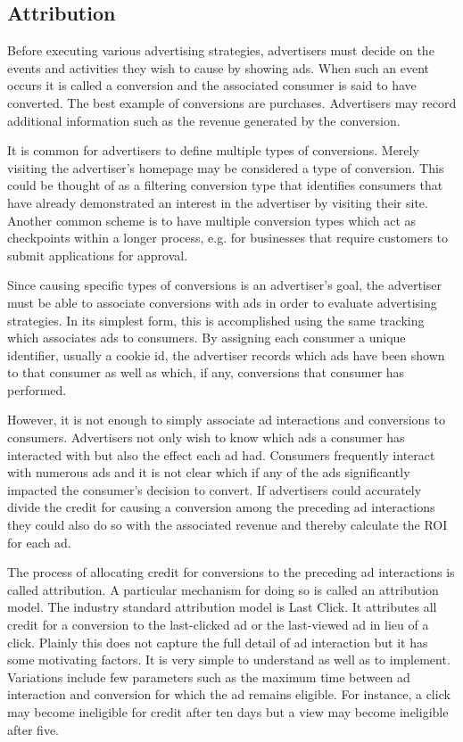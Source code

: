 \documentclass{article}
\begin{document}
\subsection{Attribution}

Before executing various advertising strategies, advertisers must decide on the events and activities they wish to cause by showing ads. When such an event occurs it is called a conversion and the associated consumer is said to have converted. The best example of conversions are purchases. Advertisers may record additional information such as the revenue generated by the conversion.

It is common for advertisers to define multiple types of conversions. Merely visiting the advertiser's homepage may be considered a type of conversion. This could be thought of as a filtering conversion type that identifies consumers that have already demonstrated an interest in the advertiser by visiting their site. Another common scheme is to have multiple conversion types which act as checkpoints within a longer process, e.g. for businesses that require customers to submit applications for approval.

Since causing specific types of conversions is an advertiser's goal, the advertiser must be able to associate conversions with ads in order to evaluate advertising strategies. In its simplest form, this is accomplished using the same tracking which associates ads to consumers. By assigning each consumer a unique identifier, usually a cookie id, the advertiser records which ads have been shown to that consumer as well as which, if any, conversions that consumer has performed.

However, it is not enough to simply associate ad interactions and conversions to consumers. Advertisers not only wish to know which ads a consumer has interacted with but also the effect each ad had. Consumers frequently interact with numerous ads and it is not clear which if any of the ads significantly impacted the consumer's decision to convert. If advertisers could accurately divide the credit for causing a conversion among the preceding ad interactions they could also do so with the associated revenue and thereby calculate the ROI for each ad.

The process of allocating credit for conversions to the preceding ad interactions is called attribution. A particular mechanism for doing so is called an attribution model. The industry standard attribution model is Last Click. It attributes all credit for a conversion to the last-clicked ad or the last-viewed ad in lieu of a click. Plainly this does not capture the full detail of ad interaction but it has some motivating factors. It is very simple to understand as well as to implement. Variations include few parameters such as the maximum time between ad interaction and conversion for which the ad remains eligible. For instance, a click may become ineligible for credit after ten days but a view may become ineligible after five.
\end{document}
